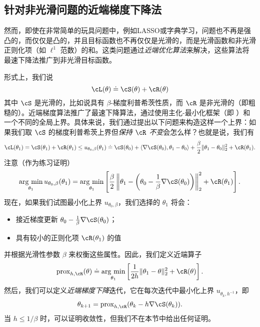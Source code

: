 \documentclass[../../book-main.tex]{subfiles}
\begin{document}
\subsection{针对非光滑问题的近端梯度下降法}\label{subsec:pgd}

然而，即使在非常简单的玩具问题中，例如LASSO或字典学习，问题也不再是强凸的，而仅仅是凸的，并且目标函数也不再仅仅是光滑的，而是光滑函数和非光滑正则化项（如 \(\ell^{1}\) 范数）的和。这类问题通过\textit{近端优化算法}来解决，这些算法将最速下降法推广到非光滑目标函数。

形式上，我们说
\begin{equation}
    \cL(\theta) \doteq \cS(\theta) + \cR(\theta)
\end{equation}
其中 \(\cS\) 是光滑的，比如说具有 \(\beta\)-梯度利普希茨性质，而 \(\cR\) 是非光滑的（即粗糙的）。近端梯度算法推广了最速下降算法，通过使用主化-最小化框架（即 ）和一个不同的全局上界。具体来说，我们通过提出以下问题来构造这样一个上界：如果我们取 \(\cS\) 的梯度利普希茨上界但\textit{保持 \(\cR\) 不变}会怎么样？也就是说，我们有
\begin{equation}
    \cL(\theta_{1}) = \cS(\theta_{1}) + \cR(\theta_{1}) \leq u_{\theta_{0}, \beta}(\theta_{1}) \doteq \cS(\theta_{0}) + \ip{\nabla \cS(\theta_{0})}{\theta_{1} - \theta_{0}} + \frac{\beta}{2}\norm{\theta_{1} - \theta_{0}}_{2}^{2} + \cR(\theta_{1}).
\end{equation}
注意（作为练习证明）
\begin{equation}
    \argmin_{\theta_{1}}u_{\theta_{0}, \beta}(\theta_{1}) = \argmin_{\theta_{1}}\bs{\frac{\beta}{2}\norm*{\theta_{1} - \bp{\theta_{0} - \frac{1}{\beta}\nabla \cS(\theta_{0})}}_{2}^{2} + \cR(\theta_{1})}.
\end{equation}
现在，如果我们试图最小化上界 \(u_{\theta_{0}, \beta}\)，我们选择的 \(\theta_{1}\) 将会：
\begin{itemize}
    \item 接近梯度更新 \(\theta_{0} - \frac{1}{\beta}\nabla \cS(\theta_{0})\)；
    \item 具有较小的正则化项 \(\cR(\theta_{1})\) 的值
\end{itemize}
并根据光滑性参数 \(\beta\) 来权衡这些属性。因此，我们定义近端算子
\begin{equation}
    \prox_{h, \cR}(\theta) \doteq \argmin_{\theta_{1}}\bs{\frac{1}{2h}\norm{\theta_{1} - \theta}_{2}^{2} + \cR(\theta)}.
\end{equation}
然后，我们可以定义\textit{近端梯度下降}迭代，它在每次迭代中最小化上界 \(u_{\theta_{k}, h^{-1}}\)，即
\begin{equation}
    \theta_{k + 1} = \prox_{h, \cR}(\theta_{k} - h\nabla \cS(\theta_{k})).
\end{equation}
当 \(h \leq 1/\beta\) 时，可以证明收敛性，但我们不在本节中给出任何证明。
\end{document}
